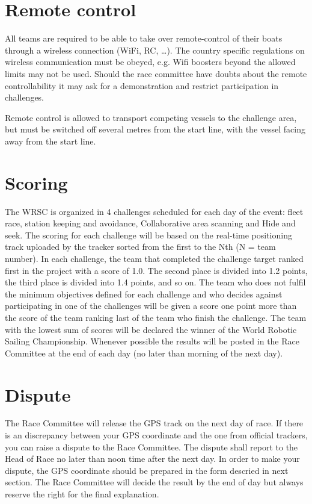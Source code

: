 \documentclass[12pt]{article}
\begin{document}
\section{Remote control}
All teams are required to be able to take over remote-control of their boats
through a wireless connection (WiFi, RC, \ldots). The country specific 
regulations on wireless communication must be obeyed, e.g. Wifi boosters beyond
the allowed limits may not be used.
Should the race committee have doubts about the remote controllability it may
ask for a demonstration and restrict participation in challenges.

Remote control is allowed to transport competing vessels to the challenge area,
but must be switched off several metres from the start line, with the vessel
facing away from the start line.


\section{Scoring}
The WRSC is organized in 4 challenges scheduled for each day of the event: ﬂeet race, station keeping and avoidance, Collaborative area scanning and Hide and seek. 
The scoring for each challenge will be based on the real-time positioning track uploaded by the tracker sorted from the first to the Nth (N = team number). 
In each challenge, the team that completed the challenge target ranked first in the project with a score of 1.0. The second place is divided into 1.2 points, the third place is divided into 1.4 points, and so on. 
The team who does not fulfil the minimum objectives defined for each challenge and who decides against participating in one of the challenges will be given a score one point more than the score of the team ranking last of the team who finish the challenge. The team with the lowest sum of scores will be declared the winner of the World Robotic Sailing Championship. Whenever possible the results will be posted in the Race Committee at the end of each day (no later than morning of the next day). 


\section{Dispute}
The Race Committee will release the GPS track on the next day of race.
If there is an discrepancy between your GPS coordinate and the one from official trackers, you can raise a dispute to the Race Committee.
The dispute shall report to the Head of Race no later than noon time after the next day.
In order to make your dispute, the GPS coordinate should be prepared in the form descried in next section.
The Race Committee will decide the result by the end of day but always reserve the right for the final explanation.  
\end{document}
